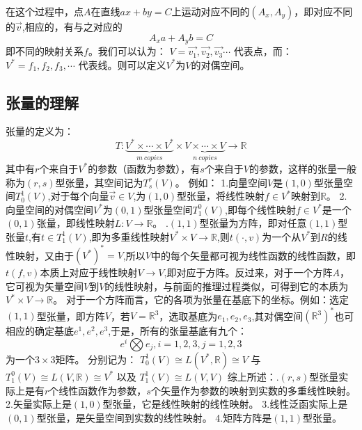 \documentclass[UTF8]{ctexart}
\begin{document}
在这个过程中，点$A$在直线$ax + by = C$上运动对应不同的$(A_x,A_y)$，即对应不同的$\overrightarrow{v}$,相应的，有与之对应的$$A_xa + A_yb = C$$ 即不同的映射关系$f$。我们可以认为：\newline
$V = \overrightarrow{v_1},\overrightarrow{v_2},\overrightarrow{v_3} \cdots$ \newline
代表点，而：\newline
$V^* = f_1,f_2,f_3,\cdots$ \newline
代表线。则可以定义$V^*$为$V$的对偶空间。
\subsection{张量的理解}
张量的定义为：
$$T : \underbrace{V^* \times \cdots \times V^*}_{m \ copies} \times \underbrace{V \times \cdots \times V}_{n \ copies} \to \mathbb{R}$$
其中有$r$个来自于$V^*$的参数（函数为参数），有$s$个来自于$V$的参数，这样的张量一般称为$(r,s)$型张量，其空间记为$T_s^r(V)$。\newline
例如：\newline
1.向量空间$V$是$(1,0)$型张量空间$T_0^1(V)$,对于每个向量$\overrightarrow{v} \in V$,为$(1,0)$型张量，将线性映射$f \in V^*$映射到$\mathbb{R}$。\newline
2.向量空间的对偶空间$V^*$为$(0,1)$型张量空间$T_1^0(V)$,即每个线性映射$f \in V^*$是一个$(0,1)$张量，即线性映射$L:V \to \mathbb{R}$。 .$(1,1)$型张量为方阵，即对任意$(1,1)$型张量$t$,有$t \in T_1^1(V)$,即为多重线性映射$V^* \times V \to \mathbb{R}$,则$t(\cdot,v)$为一个从$V^*$到$R$的线性映射，又由于$(V^*)^* = V$,所以$V$中的每个矢量都可视为线性函数的线性函数，即$t(f,v)$本质上对应于线性映射$V \to V$,即对应于方阵。反过来，对于一个方阵$A$，它可视为矢量空间$V$到$V$的线性映射，与前面的推理过程类似，可得到它的本质为$V^* \times V \to \mathbb{R}$。 \newline
对于一个方阵而言，它的各项为张量在基底下的坐标。例如：选定$(1,1)$型张量，即方阵$V$，若$V = \mathbb{R}^3$，选取基底为$e_1,e_2,e_3$,其对偶空间$(\mathbb{R}^3)^*$也可相应的确定基底$e^1,e^2,e^3$,于是，所有的张量基底有九个：$$e^i \bigotimes e_j,i = 1,2,3,j = 1,2,3$$ 为一个$3 \times 3$矩阵。\newline
分别记为：\newline
$T_0^1(V) \cong L(V^*,\mathbb{R}) \cong V$ \newline
与 \newline
$T_1^0(V) \cong L(V,\mathbb{R}) \cong V^*$ \newline
以及 \newline
$T_1^1(V) \cong L(V,V)$ \newline
综上所述：.$(r,s)$型张量实际上是有$r$个线性函数作为参数，$s$个矢量作为参数的映射到实数的多重线性映射。\newline
2.矢量实际上是$(1,0)$型张量，它是线性映射的线性映射。\newline
3.线性泛函实际上是$(0,1)$型张量，是矢量空间到实数的线性映射。\newline
4.矩阵方阵是$(1,1)$型张量。
\end{document}
